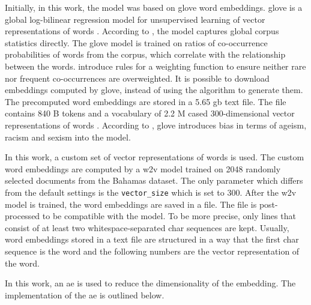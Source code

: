 Initially, in this work, the \infersent{} model was based on \acs{glove} word embeddings.
\acs{glove} is a global log-bilinear regression model for unsupervised learning of vector representations of words \cite{glove2014}. 
According to \citeauthor{glove2014}, the model captures global corpus statistics directly.
The \acs{glove} model is trained on ratios of co-occurrence probabilities of words from the corpus, 
which correlate with the relationship between the words. %
\citeauthor{glove2014} introduce rules for a weighting function to ensure neither rare nor frequent co-occurrences are overweighted.
It is possible to download embeddings computed by \acs{glove}, instead of using the algorithm to generate them.
The precomputed word embeddings are stored in a 5.65 \ac{gb} text file.
The file contains 840 B tokens and a vocabulary of 2.2 M cased 300-dimensional vector representations of words \cite{download-glove}.
According to \citeauthor{UniversalSentEnc2018}, \acs{glove} introduces bias in terms of ageism, racism and sexism into the model.

In this work, a custom set of vector representations of words is used.
The custom word embeddings are computed by a \ac{w2v} model trained on 2048 randomly selected documents from the Bahamas dataset.
The only parameter which differs from the default settings is the \texttt{vector\_size} which is set to 300.
After the \ac{w2v} model is trained, the word embeddings are saved in a file.
The file is post-processed to be compatible with the \infersent{} model.
To be more precise, only lines that consist of at least two whitespace-separated char sequences are kept.
Usually, word embeddings stored in a text file are structured in a way that 
the first char sequence is the word and the following numbers are the vector representation of the word.

In this work, an \ac{ae} is used to reduce the dimensionality of the \infersent{} embedding.
The implementation of the \ac{ae} is outlined below. %
